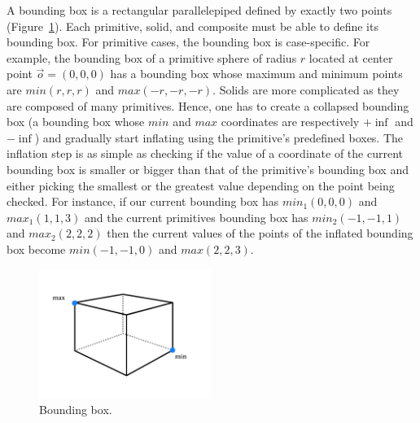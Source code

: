 \documentclass[a4paper,11pt,oneside]{article}
\begin{document}
A bounding box is a rectangular parallelepiped defined by exactly two points (Figure~\ref{sec4.2:box-points}). Each primitive, solid, and composite must be able to define its bounding box. For primitive cases, the bounding box is case-specific. For example, the bounding box of a primitive sphere of radius $r$ located at center point $\vec{o} = (0, 0, 0)$ has a bounding box whose maximum and minimum points are $min(r, r, r)$ and $max(-r, -r, -r)$. Solids are more complicated as they are composed of many primitives. Hence, one has to create a collapsed bounding box (a bounding box whose $min$ and $max$ coordinates are respectively $+\inf$ and $-\inf$) and gradually start inflating using the primitive's predefined boxes. The inflation step is as simple as checking if the value of a coordinate of the current bounding box is smaller or bigger than that of the primitive's bounding box and either picking the smallest or the greatest value depending on the point being checked. For instance, if our current bounding box has $min_{1}(0, 0, 0)$ and $max_{1}(1, 1, 3)$ and the current primitives bounding box has $min_{2}(-1, -1, 1)$ and $max_{2}(2, 2, 2)$ then the current values of the points of the inflated bounding box become $min(-1, -1, 0)$ and $max(2, 2, 3)$.


\begin{figure}[ht]
	\begin{center}
		\includegraphics[width=0.5\textwidth]{section4/4.2/box-enclosure-points.png}
	\end{center}
	\caption{Bounding box.}
	\label{sec4.2:box-points}
\end{figure}
\end{document}
